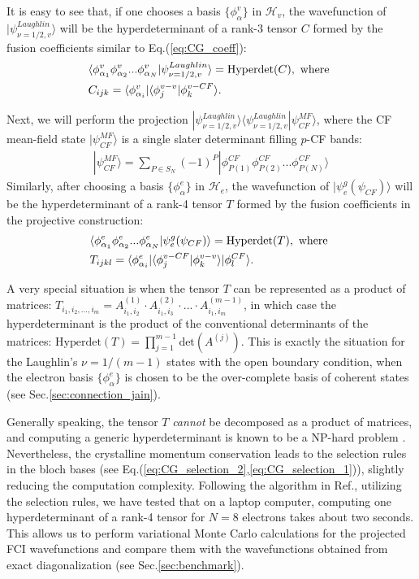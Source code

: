 It is easy to see that, if one chooses a basis $\{\phi^v_{\alpha}\}$ in $\mathcal H_v$, the wavefunction of $|\psi^{Laughlin}_{\nu=1/2,v}\rangle$ will be the hyperdeterminant of a rank-3 tensor $C$ formed by the fusion coefficients similar to Eq.(\ref{eq:CG_coeff}):
\begin{align}
     & \langle \phi^v_{\alpha_1}\phi^v_{\alpha_2}...\phi^v_{\alpha_N}|\psi^{Laughlin}_{\nu=1/2,v}\rangle=\text{Hyperdet}(C), \text { where }\notag \\
     & C_{ijk}=\langle \phi^v_{\alpha_i}|\langle \phi^{v-v}_{j}|\phi^{v-CF}_{k}\rangle.
\end{align}

Next, we will perform the projection $|\psi^{Laughlin}_{\nu=1/2,v}\rangle\langle\psi^{Laughlin}_{\nu=1/2,v}|\psi_{CF}^{MF}\rangle$, where the CF mean-field state $|\psi_{CF}^{MF}\rangle$ is a single slater determinant filling $p$-CF bands:
\begin{align}
    |\psi_{CF}^{MF}\rangle=\sum_{P\in S_N} (-1)^P |\phi^{CF}_{P(1)}\phi^{CF}_{P(2)}...\phi^{CF}_{P(N)}\rangle
\end{align}
Similarly, after choosing a basis $\{\phi^e_{\alpha}\}$ in $\mathcal H_e$, the wavefunction of $|\psi^g_e(\psi_{CF})\rangle$ will be the hyperdeterminant of a rank-4 tensor $T$ formed by the fusion coefficients in the projective construction:
\begin{align}
     & \langle \phi^e_{\alpha_1}\phi^e_{\alpha_2}...\phi^e_{\alpha_N}|\psi^g_e(\psi_{CF})\rangle=\text{Hyperdet}(T), \text { where }\notag \\
     & T_{ijkl}=\langle \phi^e_{\alpha_i}|\langle \phi^{v-CF}_{j}|\phi^{v-v}_{k}\rangle |\phi^{CF}_{l}\rangle.\label{eq:hyperdet_T}
\end{align}


A very special situation is when the tensor $T$ can be represented as a product of matrices: $T_{i_1,i_2,...,i_m}=A^{(1)}_{i_1,i_2}\cdot A^{(2)}_{i_1,i_3}\cdot...\cdot A^{(m-1)}_{i_1,i_m}$, in which case the hyperdeterminant is the product of the conventional determinants of the matrices: $\text{Hyperdet}(T)=\prod_{j=1}^{m-1}\text{det}(A^{(j)})$. This is exactly the situation for the Laughlin's $\nu=1/(m-1)$ states with the open boundary condition, when the electron basis $\{\phi^e_{\alpha}\}$ is chosen to be the over-complete basis of coherent states (see Sec.\ref{sec:connection_jain}).

Generally speaking, the tensor $T$ \emph{cannot} be decomposed as a product of matrices, and computing a generic hyperdeterminant is known to be a NP-hard problem \cite{hillar2013most}. Nevertheless, the crystalline momentum conservation leads to the selection rules in the bloch bases (see Eq.(\ref{eq:CG_selection_2},\ref{eq:CG_selection_1})), slightly reducing the computation complexity. Following the algorithm in Ref.\cite{barvinok1995new}, utilizing the selection rules, we have tested that on a laptop computer, computing one hyperdeterminant of a rank-4 tensor for $N=8$ electrons takes about two seconds. This allows us to perform variational Monte Carlo calculations for the projected FCI wavefunctions and compare them with the wavefunctions obtained from exact diagonalization (see Sec.\ref{sec:benchmark}).



